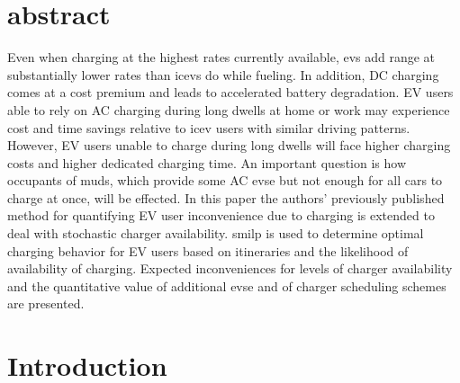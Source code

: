\documentclass[letterpaper]{sae}
\begin{document}
	
\maketitle

\section{abstract}\label{sec:abstract}

Even when charging at the highest rates currently available, \glspl{ev} add range at substantially lower rates than \glspl{icev} do while fueling. In addition, DC charging comes at a cost premium and leads to accelerated battery degradation. EV users able to rely on AC charging during long dwells at home or work may experience cost and time savings relative to \gls{icev} users with similar driving patterns. However, EV users unable to charge during long dwells will face higher charging costs and higher dedicated charging time. An important question is how occupants of \glspl{mud}, which provide some AC \gls{evse} but not enough for all cars to charge at once, will be effected. In this paper the authors’ previously published method for quantifying EV user inconvenience due to charging is extended to deal with stochastic charger availability. \gls{smilp} is used to determine optimal charging behavior for EV users based on itineraries and the likelihood of availability of charging. Expected inconveniences for levels of charger availability and the quantitative value of additional \gls{evse} and of charger scheduling schemes are presented.

\section{Introduction}\label{sec:introduction}
\end{document}
